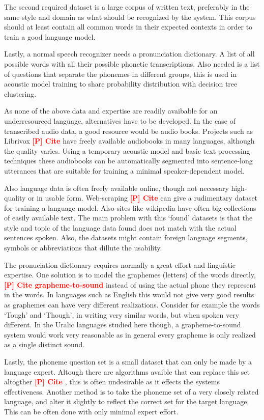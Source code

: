 \documentclass[b5paper]{article}
\newcommand{\todo}[2]{{\textcolor{red}{\bf [#1] #2 }}}
\begin{document}
The second required dataset is a large corpus of written text, preferably in the same style and domain as what should be recognized by the system. This corpus should at least contain all common words in their expected contexts in order to train a good language model.

Lastly, a normal speech recognizer needs a pronunciation dictionary. A list of all possible words with all their possible phonetic transcriptions. Also needed is a list of questions that separate the phonemes in different groups, this is used in acoustic model training to share probability distribution with decision tree clustering.

As none of the above data and expertise are readily avaibable for an underresourced language, alternatives have to be developed. In the case of transcribed audio data, a good resource would be audio books. Projects such as Librivox \todo{P}{Cite} have freely available audiobooks in many languages, although the quality varies. Using a temporary acoustic model and basic text processing techniques these audiobooks can be automatically segmented into sentence-long utterances that are suitable for training a minimal speaker-dependent model.

Also language data is often freely available online, though not necessary high-quality or in usable form. Web-scraping  \todo{P}{Cite}  can give a rudimentary dataset for training a language model. Also sites like wikipedia have often big collections of easily available text. The main problem with this `found' datasets is that the style and topic of the language data found does not match with the actual sentences spoken. Also, the datasets might contain foreign language segments, symbols or abbreviations that dillute the usability.

The pronuciation dictionary requires normally a great effort and linguistic expertise. One solution is to model the graphemes (letters) of the words directly, \todo{P}{Cite grapheme-to-sound} instead of using the actual phone they represent in the words. In languages such as English this would not give very good results as graphemes can have very different realizations. Consider for example the words `Tough' and `Though', in writing very similar words, but when spoken very different. In the Uralic languages studied here though, a grapheme-to-sound system would work very reasonable as in general every grapheme is only realized as a single distinct sound.

Lastly, the phoneme question set is a small dataset that can only be made by a language expert. Altough there are algorithms avaible that can replace this set altogther \todo{P}{Cite}, this is often undesirable as it effects the systems effectiveness. Another method is to take the phoneme set of a very closely related language, and alter it slightly to reflect the correct set for the target language. This can be often done with only minimal expert effort.
\end{document}
